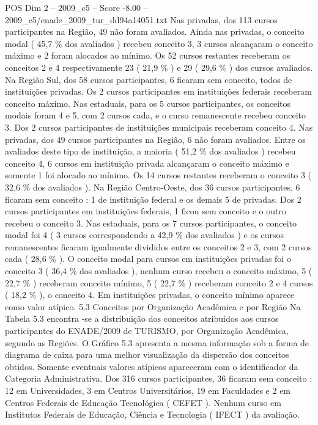 \begin{textsample}{POS Dim 2 – 2009\_c5 – Score -8.00 – 2009\_c5/enade\_2009\_tur\_dd94a14051.txt}
Nas privadas, dos 113 cursos participantes na Região, 49 não foram avaliados.
Ainda nas privadas, o conceito modal ( 45,7 \% dos avaliados ) recebeu conceito 3, 3 cursos alcançaram o conceito máximo e 2 foram alocados ao mínimo.
Os 52 cursos restantes receberam os conceitos 2 e 4 respectivamente 23 ( 21,9 \% ) e 29 ( 29,6 \% ) dos cursos avaliados.
Na Região Sul, dos 58 cursos participantes, 6 ficaram sem conceito, todos de instituições privadas.
Os 2 cursos participantes em instituições federais receberam conceito máximo.
Nas estaduais, para os 5 cursos participantes, os conceitos modais foram 4 e 5, com 2 cursos cada, e o curso remanescente recebeu conceito 3.
Dos 2 cursos participantes de instituições municipais receberam conceito 4.
Nas privadas, dos 49 cursos participantes na Região, 6 não foram avaliados.
Entre os avaliados deste tipo de instituição, a maioria ( 51,2 \% dos avaliados ) recebeu conceito 4, 6 cursos em instituição privada alcançaram o conceito máximo e somente 1 foi alocado ao mínimo.
Os 14 cursos restantes receberam o conceito 3 ( 32,6 \% dos avaliados ).
Na Região Centro-Oeste, dos 36 cursos participantes, 6 ficaram sem conceito : 1 de instituição federal e os demais 5 de privadas.
Dos 2 cursos participantes em instituições federais, 1 ficou sem conceito e o outro recebeu o conceito 3.
Nas estaduais, para os 7 cursos participantes, o conceito modal foi 4 ( 3 cursos correspondendo a 42,9 \% dos avaliados ) e os cursos remanescentes ficaram igualmente divididos entre os conceitos 2 e 3, com 2 cursos cada ( 28,6 \% ).
O conceito modal para cursos em instituições privadas foi o conceito 3 ( 36,4 \% dos avaliados ), nenhum curso recebeu o conceito máximo, 5 ( 22,7 \% ) receberam conceito mínimo, 5 ( 22,7 \% ) receberam conceito 2 e 4 cursos ( 18,2 \% ), o conceito 4.
Em instituições privadas, o conceito mínimo aparece como valor atípico. 5.3 Conceitos por Organização Acadêmica e por Região Na Tabela 5.3 encontra -se a distribuição dos conceitos atribuídos aos cursos participantes do ENADE/2009 de TURISMO, por Organização Acadêmica, segundo as Regiões.
O Gráfico 5.3 apresenta a mesma informação sob a forma de diagrama de caixa para uma melhor visualização da dispersão dos conceitos obtidos.
Somente eventuais valores atípicos apareceram com o identificador da Categoria Administrativa.
Dos 316 cursos participantes, 36 ficaram sem conceito : 12 em Universidades, 3 em Centros Universitários, 19 em Faculdades e 2 em Centros Federais de Educação Tecnológica ( CEFET ).
Nenhum curso em Institutos Federais de Educação, Ciência e Tecnologia ( IFECT ) da avaliação.

\end{textsample}
